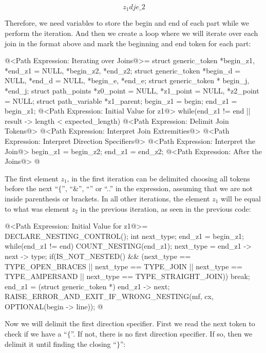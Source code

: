 $$
z_1{d} j {e}\_2
$$

Therefore, we need variables to store the begin and end of each part
while we perform the iteration. And then we create a loop where we
will iterate over each join in the format above and mark the beginning
and end token for each part:

\iniciocodigo
@<Path Expression: Iterating over Joins@>=
{
  struct generic_token *begin_z1, *end_z1 = NULL, *begin_z2, *end_z2;
  struct generic_token *begin_d = NULL, *end_d = NULL, *begin_e, *end_e;
  struct generic_token * begin_j, *end_j;
  struct path_points *z0_point = NULL, *z1_point = NULL, *z2_point = NULL;
  struct path_variable *z1_parent;
  begin_z1 = begin;
  end_z1 = begin_z1;
  @<Path Expression: Initial Value for z1@>
  while(end_z1 != end || result -> length < expected_length){
    @<Path Expression: Delimit Join Tokens@>
    @<Path Expression: Interpret Join Extremities@>
    @<Path Expression: Interpret Direction Specifiers@>
    @<Path Expression: Interpret the Join@>
    begin_z1 = begin_z2;
    end_z1 = end_z2;
  }
  @<Path Expression: After the Joins@>
}
@
\fimcodigo

The first element $z_1$, in the first iteration can be delimited
choosing all tokens before the next ``$\{$'', ``\&'', ``\-\-'' or
``..'' in the expression, assuming that we are not inside parenthesis
or brackets. In all other iterations, the element $z_1$ will be equal
to what was element $z_2$ in the previous iteration, as seen in the
previous code:

\iniciocodigo
@<Path Expression: Initial Value for z1@>=
{
  DECLARE_NESTING_CONTROL();
  int next_type;
  end_z1 = begin_z1;
  while(end_z1 != end){
    COUNT_NESTING(end_z1);
    next_type = end_z1 -> next -> type;
    if(IS_NOT_NESTED() &&
       (next_type == TYPE_OPEN_BRACES || next_type == TYPE_JOIN ||
        next_type == TYPE_AMPERSAND || next_type == TYPE_STRAIGHT_JOIN))
      break;
    end_z1 = (struct generic_token *) end_z1 -> next;
  }
  RAISE_ERROR_AND_EXIT_IF_WRONG_NESTING(mf, cx, OPTIONAL(begin -> line));
}
@
\fimcodigo

Now we will delimit the first direction specifier. First we read the
next token to check if we have a ``$\{$''. If not, there is no first
direction specifier.  If so, then we delimit it until finding the
closing ``$\}$'':

